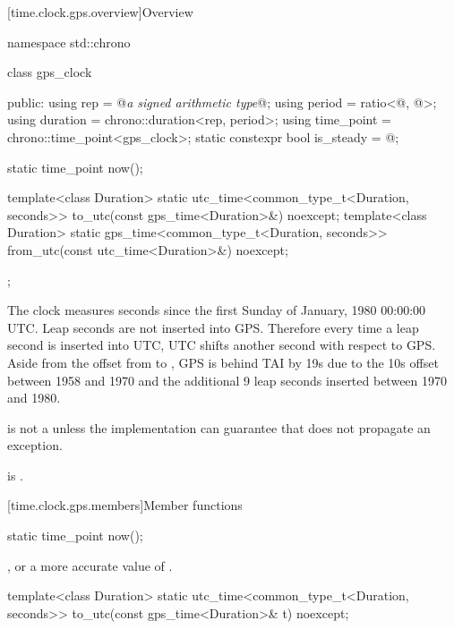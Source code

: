 [time.clock.gps.overview]{Overview}
%

\begin{codeblock}
namespace std::chrono {
  class gps_clock {
  public:
    using rep                       = @\textit{a signed arithmetic type}@;
    using period                    = ratio<@\unspecnc@, @\unspec@>;
    using duration                  = chrono::duration<rep, period>;
    using time_point                = chrono::time_point<gps_clock>;
    static constexpr bool is_steady = @\unspec@;

    static time_point now();

    template<class Duration>
      static utc_time<common_type_t<Duration, seconds>>
        to_utc(const gps_time<Duration>&) noexcept;
    template<class Duration>
      static gps_time<common_type_t<Duration, seconds>>
        from_utc(const utc_time<Duration>&) noexcept;
  };
}
\end{codeblock}

\pnum
The clock  measures
seconds since the first Sunday of January, 1980 00:00:00 UTC\@.
Leap seconds are not inserted into GPS\@.
Therefore every time a leap second is inserted into UTC,
UTC shifts another second with respect to GPS\@.
Aside from the offset from  to ,
GPS is behind TAI by 19s due to the 10s offset between 1958 and 1970
and the additional 9 leap seconds inserted between 1970 and 1980.

\pnum
{} is not a 
unless the implementation can guarantee that
 does not propagate an exception.
\begin{note}
 is .
\end{note}

[time.clock.gps.members]{Member functions}

%
\begin{itemdecl}
static time_point now();
\end{itemdecl}

\begin{itemdescr}
\pnum
\returns
{}, or a more accurate value of .
\end{itemdescr}

%
\begin{itemdecl}
template<class Duration>
  static utc_time<common_type_t<Duration, seconds>>
    to_utc(const gps_time<Duration>& t) noexcept;
\end{itemdecl}

